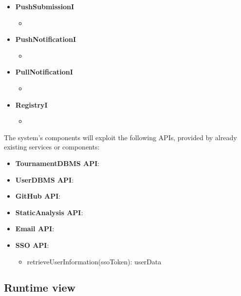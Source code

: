 \begin{itemize}
    \item \textbf{PushSubmissionI}
    \begin{itemize}
        \item 
    \end{itemize}
    \item \textbf{PushNotificationI}
    \begin{itemize}
        \item 
    \end{itemize}
    \item \textbf{PullNotificationI}
    \begin{itemize}
        \item 
    \end{itemize}
    \item \textbf{RegistryI}
    \begin{itemize}
        \item 
    \end{itemize}
\end{itemize}

The system's components will exploit the following APIs, provided by already existing services or components:
\begin{itemize}
    \item \textbf{TournamentDBMS API}: 
    \item \textbf{UserDBMS API}: 
    \item \textbf{GitHub API}: 
    \item \textbf{StaticAnalysis API}: 
    \item \textbf{Email API}:
    \item \textbf{SSO API}:
        \begin{itemize}
            \item retrieveUserInformation(ssoToken): userData
        \end{itemize}
\end{itemize}












\subsection{Runtime view}
